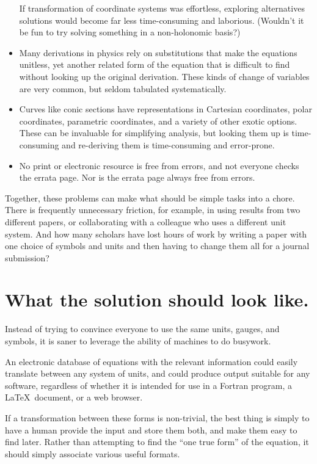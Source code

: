 \documentclass[12pt,letterpaper]{article}
\begin{document}
\begin{itemize}
      If transformation of coordinate systems was effortless,
      exploring alternatives solutions would become far less time-consuming and laborious.
      (Wouldn't it be fun to try solving something in a non-holonomic basis?)
\item Many derivations in physics rely on substitutions that make the equations unitless,
      yet another related form of the equation that is difficult to find without looking up the original derivation.
      These kinds of change of variables are very common,
      but seldom tabulated systematically.
\item Curves like conic sections have representations in Cartesian coordinates,
      polar coordinates, parametric coordinates, and a variety of other exotic options.
      These can be invaluable for simplifying analysis,
      but looking them up is time-consuming
      and re-deriving them is time-consuming and error-prone.
\item No print or electronic resource is free from errors,
      and not everyone checks the errata page.
      Nor is the errata page always free from errors.
\end{itemize}

Together, these problems can make what should be simple tasks into a chore.
There is frequently unnecessary friction,
for example,
in using results from two different papers,
or collaborating with a colleague who uses a different unit system.
And how many scholars have lost hours of work
by writing a paper with one choice of symbols and units
and then having to change them all for a journal submission?

\section{What the solution should look like.}

Instead of trying to convince everyone to use the same units, gauges, and symbols,
it is saner to leverage the ability of machines to do busywork.

An electronic database of equations with the relevant information could easily translate between any system of units,
and could produce output suitable for any software,
regardless of whether it is intended for use in a Fortran program,
a \LaTeX\ document,
or a web browser.

If a transformation between these forms is non-trivial,
the best thing is simply to have a human provide the input and store them both,
and make them easy to find later.
Rather than attempting to find the ``one true form'' of the equation,
it should simply associate various useful formats.
\end{document}
